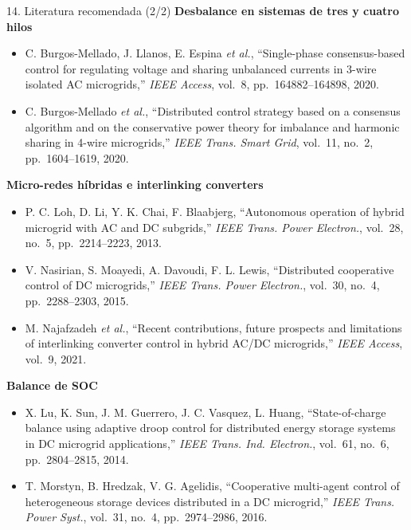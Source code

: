 \documentclass[aspectratio=169,11pt]{beamer}
\begin{document}
\begin{frame}{14. Literatura recomendada (2/2)}
  \scriptsize
  \textbf{Desbalance en sistemas de tres y cuatro hilos}
  \begin{itemize}\setlength\itemsep{1pt}
    \item[{[5]}] C. Burgos-Mellado, J. Llanos, E. Espina \emph{et al.}, ``Single-phase consensus-based control for regulating voltage and sharing unbalanced currents in 3-wire isolated AC microgrids,'' \emph{IEEE Access}, vol.~8, pp.~164882--164898, 2020.
    \item[{[6]}] C. Burgos-Mellado \emph{et al.}, ``Distributed control strategy based on a consensus algorithm and on the conservative power theory for imbalance and harmonic sharing in 4-wire microgrids,'' \emph{IEEE Trans. Smart Grid}, vol.~11, no.~2, pp.~1604--1619, 2020.
  \end{itemize}
  \textbf{Micro-redes híbridas e interlinking converters}
  \begin{itemize}\setlength\itemsep{1pt}
    \item[{[10]}] P. C. Loh, D. Li, Y. K. Chai, F. Blaabjerg, ``Autonomous operation of hybrid microgrid with AC and DC subgrids,'' \emph{IEEE Trans. Power Electron.}, vol.~28, no.~5, pp.~2214--2223, 2013.
    \item[{[8]}] V. Nasirian, S. Moayedi, A. Davoudi, F. L. Lewis, ``Distributed cooperative control of DC microgrids,'' \emph{IEEE Trans. Power Electron.}, vol.~30, no.~4, pp.~2288--2303, 2015.
    \item[{[13]}] M. Najafzadeh \emph{et al.}, ``Recent contributions, future prospects and limitations of interlinking converter control in hybrid AC/DC microgrids,'' \emph{IEEE Access}, vol.~9, 2021.
  \end{itemize}
  \textbf{Balance de SOC}
  \begin{itemize}\setlength\itemsep{1pt}
    \item[{[11]}] X. Lu, K. Sun, J. M. Guerrero, J. C. Vasquez, L. Huang, ``State-of-charge balance using adaptive droop control for distributed energy storage systems in DC microgrid applications,'' \emph{IEEE Trans. Ind. Electron.}, vol.~61, no.~6, pp.~2804--2815, 2014.
    \item[{[12]}] T. Morstyn, B. Hredzak, V. G. Agelidis, ``Cooperative multi-agent control of heterogeneous storage devices distributed in a DC microgrid,'' \emph{IEEE Trans. Power Syst.}, vol.~31, no.~4, pp.~2974--2986, 2016.
  \end{itemize}
\end{frame}
\end{document}
